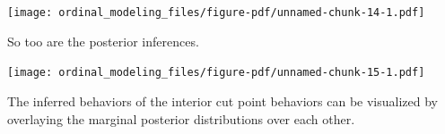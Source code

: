 \documentclass[
  letterpaper,
  DIV=11,
  numbers=noendperiod]{scrartcl}
\newenvironment{Shaded}{\begin{snugshade}}{\end{snugshade}}
\newcommand{\AttributeTok}[1]{\textcolor[rgb]{0.40,0.45,0.13}{#1}}
\newcommand{\ControlFlowTok}[1]{\textcolor[rgb]{0.00,0.23,0.31}{#1}}
\newcommand{\DecValTok}[1]{\textcolor[rgb]{0.68,0.00,0.00}{#1}}
\newcommand{\FunctionTok}[1]{\textcolor[rgb]{0.28,0.35,0.67}{#1}}
\newcommand{\NormalTok}[1]{\textcolor[rgb]{0.00,0.23,0.31}{#1}}
\newcommand{\OtherTok}[1]{\textcolor[rgb]{0.00,0.23,0.31}{#1}}
\newcommand{\SpecialCharTok}[1]{\textcolor[rgb]{0.37,0.37,0.37}{#1}}
\newcommand{\StringTok}[1]{\textcolor[rgb]{0.13,0.47,0.30}{#1}}
\begin{document}
\texttt{[image: ordinal\_modeling\_files/figure-pdf/unnamed-chunk-14-1.pdf]}

So too are the posterior inferences.

\begin{Shaded}
\end{Shaded}

\texttt{[image: ordinal\_modeling\_files/figure-pdf/unnamed-chunk-15-1.pdf]}

The inferred behaviors of the interior cut point behaviors can be
visualized by overlaying the marginal posterior distributions over each
other.
\end{document}
